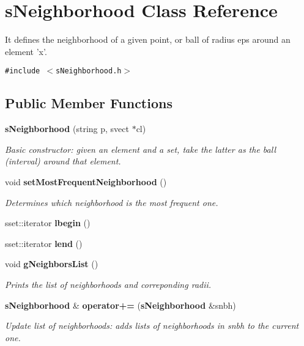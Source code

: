 \section{s\-Neighborhood Class Reference}
\label{classsNeighborhood}
It defines the neighborhood of a given point, or ball of radius eps around an element 'x'.  


{\tt \#include $<$s\-Neighborhood.h$>$}

\subsection*{Public Member Functions}
\begin{CompactItemize}
\item 
{\bf s\-Neighborhood} (string p, svect $\ast$cl)
\begin{CompactList}\small\item\em Basic constructor: given an element and a set, take the latter as the ball (interval) around that element. \item\end{CompactList}\item 
void {\bf set\-Most\-Frequent\-Neighborhood} ()
\begin{CompactList}\small\item\em Determines which neighborhood is the most frequent one. \item\end{CompactList}\item 
sset::iterator {\bf lbegin} ()\label{classsNeighborhood_a3}

\item 
sset::iterator {\bf lend} ()\label{classsNeighborhood_a4}

\item 
void {\bf g\-Neighbors\-List} ()\label{classsNeighborhood_a5}

\begin{CompactList}\small\item\em Prints the list of neighborhoods and correponding radii. \item\end{CompactList}\item 
{\bf s\-Neighborhood} \& {\bf operator+=} ({\bf s\-Neighborhood} \&snbh)
\begin{CompactList}\small\item\em Update list of neighborhoods: adds lists of neighborhoods in snbh to the current one. \item\end{CompactList}\end{CompactItemize}
